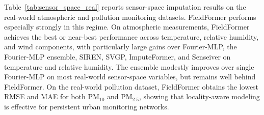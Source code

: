 Table~\ref{tab:sensor_space_real} reports sensor-space imputation results on the real-world atmospheric and pollution monitoring datasets. FieldFormer performs especially strongly in this regime. On atmospheric measurements, FieldFormer achieves the best or near-best performance across temperature, relative humidity, and wind components, with particularly large gains over Fourier-MLP, the Fourier-MLP ensemble, SIREN, SVGP, ImputeFormer, and Senseiver on temperature and relative humidity. The ensemble modestly improves over single Fourier-MLP on most real-world sensor-space variables, but remains well behind FieldFormer. On the real-world pollution dataset, FieldFormer obtains the lowest RMSE and MAE for both PM$_{10}$ and PM$_{2.5}$, showing that locality-aware modeling is effective for persistent urban monitoring networks.

